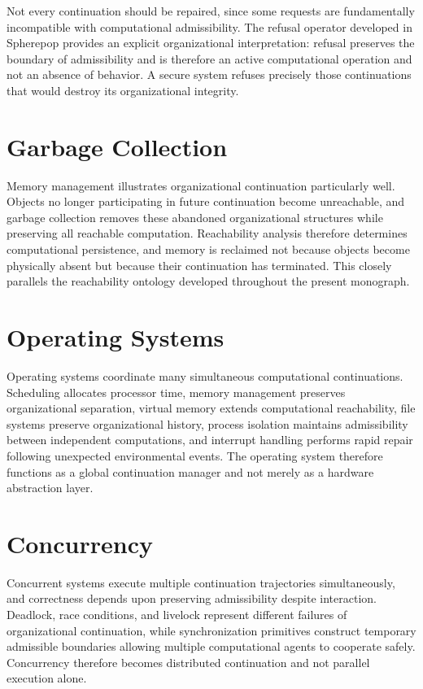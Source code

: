 \documentclass[11pt,oneside]{book}
\numberwithin{equation}{chapter}
\theoremstyle{definition}
\theoremstyle{plain}
\begin{document}
Not every continuation should be repaired, since some requests are fundamentally incompatible with computational admissibility. The refusal operator developed in Spherepop provides an explicit organizational interpretation: refusal preserves the boundary of admissibility and is therefore an active computational operation and not an absence of behavior. A secure system refuses precisely those continuations that would destroy its organizational integrity.

\section{Garbage Collection}

Memory management illustrates organizational continuation particularly well. Objects no longer participating in future continuation become unreachable, and garbage collection removes these abandoned organizational structures while preserving all reachable computation. Reachability analysis therefore determines computational persistence, and memory is reclaimed not because objects become physically absent but because their continuation has terminated. This closely parallels the reachability ontology developed throughout the present monograph.

\section{Operating Systems}

Operating systems coordinate many simultaneous computational continuations. Scheduling allocates processor time, memory management preserves organizational separation, virtual memory extends computational reachability, file systems preserve organizational history, process isolation maintains admissibility between independent computations, and interrupt handling performs rapid repair following unexpected environmental events. The operating system therefore functions as a global continuation manager and not merely as a hardware abstraction layer.

\section{Concurrency}

Concurrent systems execute multiple continuation trajectories simultaneously, and correctness depends upon preserving admissibility despite interaction. Deadlock, race conditions, and livelock represent different failures of organizational continuation, while synchronization primitives construct temporary admissible boundaries allowing multiple computational agents to cooperate safely. Concurrency therefore becomes distributed continuation and not parallel execution alone.
\end{document}
